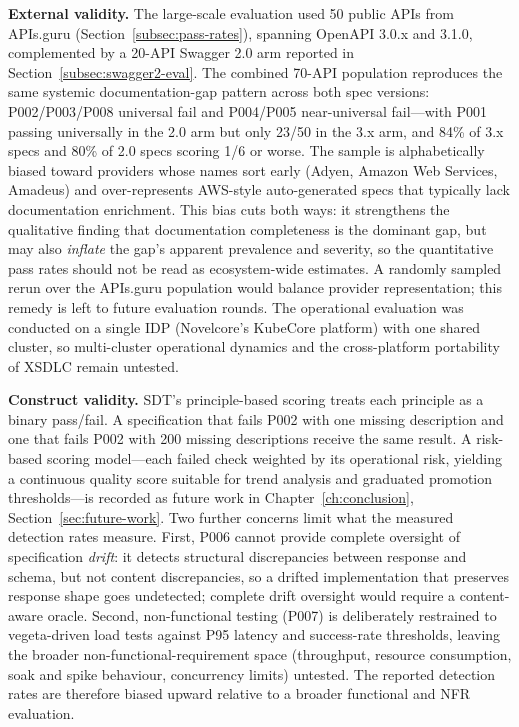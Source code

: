 \textbf{External validity.} The large-scale evaluation used 50 public APIs from APIs.guru (Section~\ref{subsec:pass-rates}), spanning OpenAPI 3.0.x and 3.1.0, complemented by a 20-API Swagger 2.0 arm reported in Section~\ref{subsec:swagger2-eval}. The combined 70-API population reproduces the same systemic documentation-gap pattern across both spec versions: P002/P003/P008 universal fail and P004/P005 near-universal fail---with P001 passing universally in the 2.0 arm but only 23/50 in the 3.x arm, and 84\% of 3.x specs and 80\% of 2.0 specs scoring 1/6 or worse. The sample is alphabetically biased toward providers whose names sort early (Adyen, Amazon Web Services, Amadeus) and over-represents AWS-style auto-generated specs that typically lack documentation enrichment. This bias cuts both ways: it strengthens the qualitative finding that documentation completeness is the dominant gap, but may also \emph{inflate} the gap's apparent prevalence and severity, so the quantitative pass rates should not be read as ecosystem-wide estimates. A randomly sampled rerun over the APIs.guru population would balance provider representation; this remedy is left to future evaluation rounds. The operational evaluation was conducted on a single IDP (Novelcore's KubeCore platform) with one shared cluster, so multi-cluster operational dynamics and the cross-platform portability of XSDLC remain untested.

\textbf{Construct validity.} SDT's principle-based scoring treats each principle as a binary pass/fail. A specification that fails P002 with one missing description and one that fails P002 with 200 missing descriptions receive the same result. A risk-based scoring model---each failed check weighted by its operational risk, yielding a continuous quality score suitable for trend analysis and graduated promotion thresholds---is recorded as future work in Chapter~\ref{ch:conclusion}, Section~\ref{sec:future-work}. Two further concerns limit what the measured detection rates measure. First, P006 cannot provide complete oversight of specification \emph{drift}: it detects structural discrepancies between response and schema, but not content discrepancies, so a drifted implementation that preserves response shape goes undetected; complete drift oversight would require a content-aware oracle. Second, non-functional testing (P007) is deliberately restrained to vegeta-driven load tests against P95 latency and success-rate thresholds, leaving the broader non-functional-requirement space (throughput, resource consumption, soak and spike behaviour, concurrency limits) untested. The reported detection rates are therefore biased upward relative to a broader functional and NFR evaluation.


